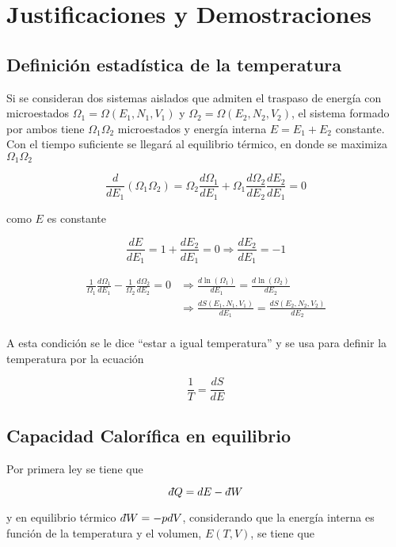 \section{Justificaciones y Demostraciones}

\subsection{Definición estadística de la temperatura}
\label{DTemperatura}
Si se consideran dos sistemas aislados que admiten el traspaso de energía con microestados $\Omega_1 = \Omega(E_1, N_1, V_1)$ y $\Omega_2 = \Omega(E_2, N_2, V_2)$, el sistema formado por ambos tiene $\Omega_1\Omega_2$ microestados y energía interna $E = E_1+E_2$ constante. Con el tiempo suficiente se llegará al equilibrio térmico, en donde se maximiza $\Omega_1\Omega_2$

\[\frac{d}{dE_1}(\Omega_1\Omega_2)=
\Omega_2\frac{d\Omega_1}{dE_1} + 
\Omega_1\frac{d\Omega_2}{dE_2}\frac{dE_2}{dE_1}=0\]

como $E$ es constante

\[\frac{dE}{dE_1}=1+\frac{dE_2}{dE_1}=0
\Rightarrow \frac{dE_2}{dE_1}=-1\]

\begin{equation}
\begin{split}
    \frac{1}{\Omega_1}\frac{d\Omega_1}{dE_1}-
    \frac{1}{\Omega_2}\frac{d\Omega_2}{dE_2}=0
    & \Rightarrow \frac{d\ln{(\Omega_1)}}{dE_1} =
    \frac{d\ln{(\Omega_2)}}{dE_2}\\
    & \Rightarrow \frac{dS(E_1,N_1,V_1)}{dE_1} =
    \frac{dS(E_2,N_2,V_2)}{dE_2}\\
\end{split}
\nonumber
\end{equation}

A esta condición se le dice \enquote{estar a igual temperatura} y se usa para definir la temperatura por la ecuación

\[\frac{1}{T}=\frac{dS}{dE}\]

\subsection{Capacidad Calorífica en equilibrio}
\label{Cequilibrio}

Por primera ley se tiene que

\[d\hspace*{-0.08em}\bar{}\hspace*{0.1em} Q = dE - d\hspace*{-0.08em}\bar{}\hspace*{0.1em} W\]

y en equilibrio térmico $d\hspace*{-0.08em}\bar{}\hspace*{0.1em} W = -pdV$, considerando que la energía interna es función de la temperatura y el volumen, $E(T,V)$, se tiene que

